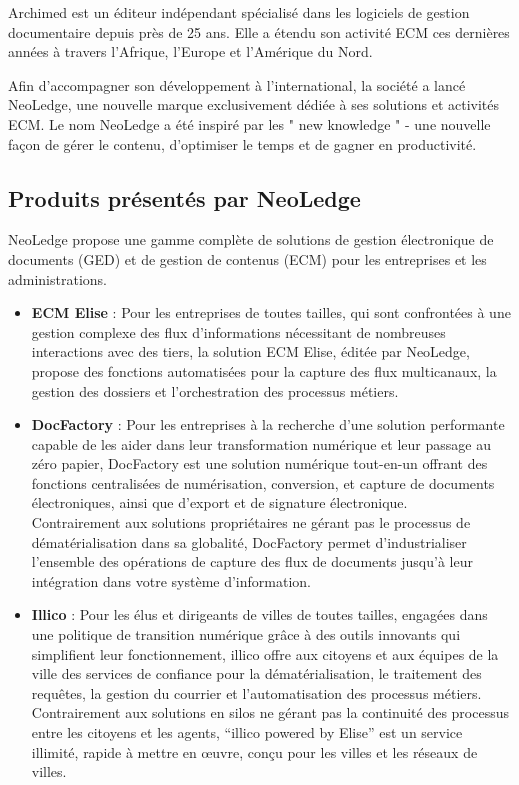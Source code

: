 Archimed est un éditeur indépendant spécialisé dans les logiciels de gestion documentaire depuis près de 25 ans. Elle a étendu son activité ECM ces dernières années à travers l'Afrique, l'Europe et l'Amérique du Nord.

\medskip
Afin d'accompagner son développement à l'international, la société a lancé NeoLedge, une nouvelle marque exclusivement dédiée à ses solutions et activités ECM. Le nom NeoLedge a été inspiré par les " new knowledge " - une nouvelle façon de gérer le contenu, d'optimiser le temps et de gagner en productivité.


\subsection{Produits présentés par NeoLedge }
NeoLedge propose une gamme complète de solutions de gestion électronique de documents (GED) et de gestion de contenus (ECM) pour les entreprises et les administrations.

\medskip
\begin{itemize}
\item \textbf{ECM Elise} : Pour les entreprises de toutes tailles, qui sont confrontées à une gestion complexe des flux d'informations nécessitant de nombreuses interactions avec des tiers, la solution ECM Elise, éditée par NeoLedge, propose des fonctions automatisées pour la capture des flux multicanaux, la gestion des dossiers et l'orchestration des processus métiers.

\item \textbf{DocFactory} : Pour les entreprises à la recherche d'une solution performante capable de les aider dans leur transformation numérique et leur passage au zéro papier, DocFactory est une solution numérique tout-en-un offrant des fonctions centralisées de numérisation, conversion, et capture de documents électroniques, ainsi que d'export et de signature électronique.\\
Contrairement aux solutions propriétaires ne gérant pas le processus de dématérialisation dans sa globalité, DocFactory permet d'industrialiser l'ensemble des opérations de capture des flux de documents jusqu'à leur intégration dans votre système d'information.



\item \textbf{Illico} : Pour les élus et dirigeants de villes de toutes tailles, engagées dans une politique de transition numérique grâce à des outils innovants qui simplifient leur fonctionnement, illico offre aux citoyens et aux équipes de la ville des services de confiance pour la dématérialisation, le traitement des requêtes, la gestion du courrier et l'automatisation des processus métiers. Contrairement aux solutions en silos ne gérant pas la continuité des processus entre les citoyens et les agents, “illico powered by Elise” est un service illimité, rapide à mettre en œuvre, conçu pour les villes et les réseaux de villes.


\end{itemize}

